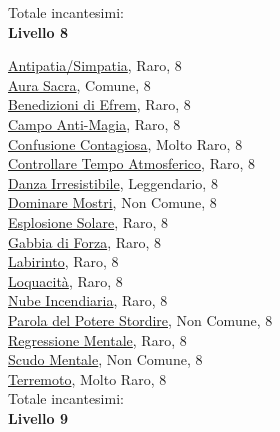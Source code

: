 \begin{multicols}{3}
{{\medskip Totale incantesimi: \theinclvsette\\

\textbf{Livello 8}

\hyperlink{Antipatia/Simpatia}{Antipatia/Simpatia}, Raro, 8\\
\hyperlink{Aura Sacra}{Aura Sacra}, Comune, 8\\
\hyperlink{Benedizioni di Efrem}{Benedizioni di Efrem}, Raro, 8\\
\hyperlink{Campo Anti-Magia}{Campo Anti-Magia}, Raro, 8\\
\hyperlink{Confusione Contagiosa}{Confusione Contagiosa}, Molto Raro, 8\\
\hyperlink{Controllare Tempo Atmosferico}{Controllare Tempo Atmosferico}, Raro, 8\\
\hyperlink{Danza Irresistibile}{Danza Irresistibile}, Leggendario, 8\\
\hyperlink{Dominare Mostri}{Dominare Mostri}, Non Comune, 8\\
\hyperlink{Esplosione Solare}{Esplosione Solare}, Raro, 8\\
\hyperlink{Gabbia di Forza}{Gabbia di Forza}, Raro, 8\\
\hyperlink{Labirinto}{Labirinto}, Raro, 8\\
\hyperlink{Loquacità}{Loquacità}, Raro, 8\\
\hyperlink{Nube Incendiaria}{Nube Incendiaria}, Raro, 8\\
\hyperlink{Parola del Potere Stordire}{Parola del Potere Stordire}, Non Comune, 8\\
\hyperlink{Regressione Mentale}{Regressione Mentale}, Raro, 8\\
\hyperlink{Scudo Mentale}{Scudo Mentale}, Non Comune, 8\\
\hyperlink{Terremoto}{Terremoto}, Molto Raro, 8\\

\medskip Totale incantesimi: \theinclvotto\\

\textbf{Livello 9} 

}}
\end{multicols}
